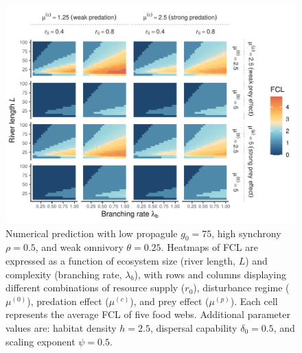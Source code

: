\begin{figure}
\centering
\includegraphics{../data_fmt/fig_rho05_g75_theta025.pdf}
\caption{\label{fig:fig-num3}Numerical prediction with low propagule
\(g_0 = 75\), high synchrony \(\rho = 0.5\), and weak omnivory
\(\theta = 0.25\). Heatmaps of FCL are expressed as a function of
ecosystem size (river length, \(L\)) and complexity (branching rate,
\(\lambda_b\)), with rows and columns displaying different combinations
of resource supply (\(r_0\)), disturbance regime (\(\mu^{(0)}\)),
predation effect (\(\mu^{(c)}\)), and prey effect (\(\mu^{(p)}\)). Each
cell represents the average FCL of five food webs. Additional parameter
values are: habitat density \(h=2.5\), dispersal capability
\(\delta_0=0.5\), and scaling exponent \(\psi=0.5\).}
\end{figure}

\newpage

